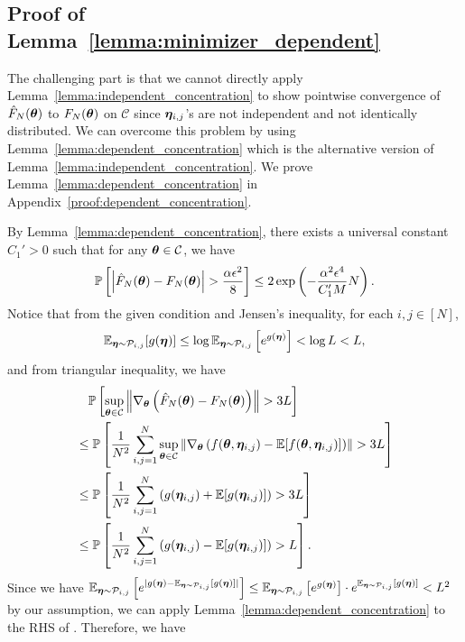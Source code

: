 \subsection{Proof of Lemma~\ref{lemma:minimizer_dependent}}\label{proof:minimizer_dependent}
The challenging part is that we cannot directly apply Lemma~\ref{lemma:independent_concentration} to show pointwise convergence of $\hat{F}_N({\bm{\theta}})$ to $F_N({\bm{\theta}})$ on $\mathcal{C}$ since ${\bm{\eta}}_{i,j}$'s are not independent and not identically distributed. We can overcome this problem by using Lemma~\ref{lemma:dependent_concentration} which is the alternative version of Lemma~\ref{lemma:independent_concentration}. We prove Lemma~\ref{lemma:dependent_concentration} in Appendix~\ref{proof:dependent_concentration}.

By Lemma~\ref{lemma:dependent_concentration}, there exists a universal constant $C_1'>0$ such that  for any ${\bm{\theta}} \in \mathcal{C}$, we have
\begin{equation*}
\mathbb{P}\left[ \left| \hat{F}_N(\vtheta) - F_N(\vtheta)\right|> \frac{\alpha \epsilon^2 }{8}\right] \leq 2 \exp \left( - \frac{ \alpha^2 \epsilon^4}{C_1' M}N\right).
\end{equation*}
Notice that from the given condition and Jensen's inequality, for each $i,j \in [N]$, 
\begin{equation*}
    \mathbb{E}_{{\bm{\eta}} \sim \mathcal{P}_{i,j}}[g({\bm{\eta}})] \leq \log \mathbb{E}_{{\bm{\eta}} \sim \mathcal{P}_{i,j}}\left[e^{g({\bm{\eta}})}\right] < \log L <L,
\end{equation*}
and from triangular inequality, we have
\begin{align}
\label{eq:lemmaminimizer_dependent-1}
 &\quad \mathbb{P}\left[ \sup_{{\bm{\theta}} \in \mathcal{C}}\left\lVert \nabla_{\bm{\theta}} \left( \hat{F}_N({\bm{\theta}}) - F_N({\bm{\theta}}) \right)\right\rVert > 3 L \right] \nonumber \\
 &\leq \mathbb{P}\left[ \frac{1}{N^2} \sum_{i,j=1}^N \sup_{{\bm{\theta}} \in \mathcal{C}}\left\lVert \nabla_{\bm{\theta}} \left( f({\bm{\theta}}, {\bm{\eta}}_{i,j}) - \mathbb{E}[f({\bm{\theta}}, {\bm{\eta}}_{i,j})] \right)\right\rVert > 3 L\right]\nonumber \\
 &\leq \mathbb{P} \left[ \frac{1}{N^2} \sum_{i,j=1}^N \left( g({\bm{\eta}}_{i,j}) + \mathbb{E}[g({\bm{\eta}}_{i,j})] \right)> 3 L \right] \nonumber \\
 &\leq \mathbb{P} \left[ \frac{1}{N^2} \sum_{i,j=1}^N \left( g({\bm{\eta}}_{i,j}) - \mathbb{E}[g({\bm{\eta}}_{i,j})] \right)> L \right].
\end{align}
Since we have $\mathbb{E}_{{\bm{\eta}} \sim \mathcal{P}_{i,j}}\left [e^{ |g({\bm{\eta}}) - \mathbb{E}_{{\bm{\eta}}\sim \mathcal{
P}_{i,j}}[g({\bm{\eta}})]|} \right] \leq \mathbb{E}_{{\bm{\eta}} \sim \mathcal{P}_{i,j}}\left [e^{ g({\bm{\eta}})} \right] \cdot e^{\mathbb{E}_{{\bm{\eta}}\sim \mathcal{
P}_{i,j}}[g({\bm{\eta}})] }<L^2$ by our assumption, we can apply Lemma~\ref{lemma:dependent_concentration} to the RHS of . Therefore, we have
